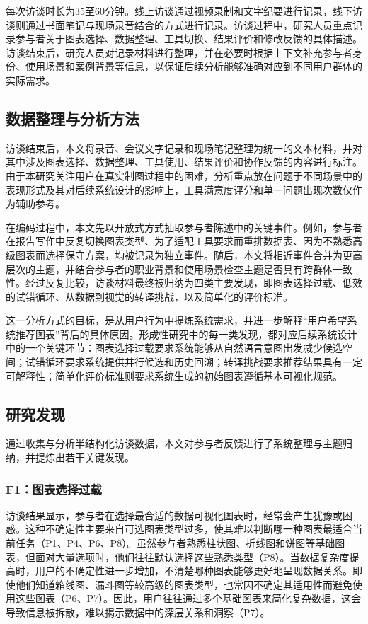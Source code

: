 每次访谈时长为35至60分钟。线上访谈通过视频录制和文字纪要进行记录，线下访谈则通过书面笔记与现场录音结合的方式进行记录。访谈过程中，研究人员重点记录参与者关于图表选择、数据整理、工具切换、结果评价和修改反馈的具体描述。访谈结束后，研究人员对记录材料进行整理，并在必要时根据上下文补充参与者身份、使用场景和案例背景等信息，以保证后续分析能够准确对应到不同用户群体的实际需求。

\subsection{数据整理与分析方法}

访谈结束后，本文将录音、会议文字记录和现场笔记整理为统一的文本材料，并对其中涉及图表选择、数据整理、工具使用、结果评价和协作反馈的内容进行标注。由于本研究关注用户在真实制图过程中的困难，分析重点放在问题于不同场景中的表现形式及其对后续系统设计的影响上，工具满意度评分和单一问题出现次数仅作为辅助参考。

在编码过程中，本文先以开放式方式抽取参与者陈述中的关键事件。例如，参与者在报告写作中反复切换图表类型、为了适配工具要求而重排数据表、因为不熟悉高级图表而选择保守方案，均被记录为独立事件。随后，本文将相近事件合并为更高层次的主题，并结合参与者的职业背景和使用场景检查主题是否具有跨群体一致性。经过反复比较，访谈材料最终被归纳为四类主要发现，即图表选择过载、低效的试错循环、从数据到视觉的转译挑战，以及简单化的评价标准。

这一分析方式的目标，是从用户行为中提炼系统需求，并进一步解释“用户希望系统推荐图表”背后的具体原因。形成性研究中的每一类发现，都对应后续系统设计中的一个关键环节：图表选择过载要求系统能够从自然语言意图出发减少候选空间；试错循环要求系统提供并行候选和历史回溯；转译挑战要求推荐结果具有一定可解释性；简单化评价标准则要求系统生成的初始图表遵循基本可视化规范。

\subsection{研究发现}

通过收集与分析半结构化访谈数据，本文对参与者反馈进行了系统整理与主题归纳，并提炼出若干关键发现。

\subsubsection{F1：图表选择过载}

访谈结果显示，参与者在选择最合适的数据可视化图表时，经常会产生犹豫或困惑。这种不确定性主要来自可选图表类型过多，使其难以判断哪一种图表最适合当前任务（P1、P4、P6、P8）。虽然参与者熟悉柱状图、折线图和饼图等基础图表，但面对大量选项时，他们往往默认选择这些熟悉类型（P8）。当数据复杂度提高时，用户的不确定性进一步增加，不清楚哪种图表能够更好地呈现数据关系。即使他们知道箱线图、漏斗图等较高级的图表类型，也常因不确定其适用性而避免使用这些图表（P6、P7）。因此，用户往往通过多个基础图表来简化复杂数据，这会导致信息被拆散，难以揭示数据中的深层关系和洞察（P7）。

